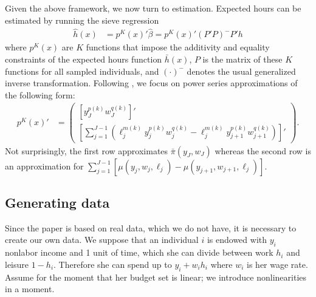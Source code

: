 \documentclass[11pt,letterpaper]{article}                  %
\begin{document}
Given the above framework, we now turn to estimation.
Expected hours can be estimated by running the sieve regression
\begin{align*}
	\hat{h}(x) &= p^K (x)' \hat{\beta} = p^K (x)' (P' P)^- P' h
\end{align*}
where $p^K (x)$ are $K$ functions that impose the additivity and equality constraints of the expected hours function $\bar{h} (x)$, $P$ is the matrix of these $K$ functions for all sampled individuals, and $(\cdot)^-$ denotes the usual generalized inverse transformation.
Following \citet{Blomquist2002}, we focus on power series approximations of the following form:
\begin{align*}
	p^K (x)' &= \begin{pmatrix}
		\left[ y_J^{p(k)} w_J^{q(k)} \right] ' \\
		\left[ \sum_{j=1}^{J-1} \left( \ell_j^{m(k)} y_j^{p(k)} w_j^{q(k)} - \ell_j^{m(k)} y_{j+1}^{p(k)} w_{j+1}^{q(k)} \right) \right]'
	\end{pmatrix}.
\end{align*}
Not surprisingly, the first row approximates $\bar{\pi} (y_J, w_J)$ whereas the second row is an approximation for $\sum_{j=1}^{J-1} [\mu(y_j, w_j, \ell_j) - \mu(y_{j+1}, w_{j+1}, \ell_j)]$.

\subsection{Generating data}
Since the paper is based on real data, which we do not have,
it is necessary to create our own data. We suppose that an individual $i$ is endowed with $y_i$ nonlabor income and 1 unit of time, which she can divide between work $h_i$ and leisure $1-h_i$.
Therefore she can spend up to $y_i + w_i h_i$ where $w_i$ is her wage rate.
Assume for the moment that her budget set is linear; we introduce nonlinearities in a moment.
\end{document}

